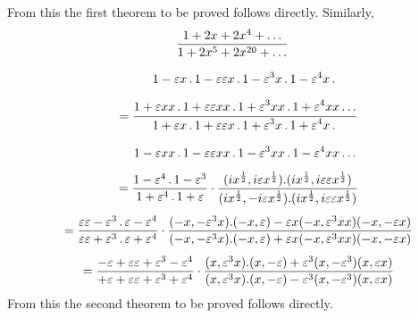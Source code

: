 From this the first theorem to be proved follows directly. Similarly,
\[
\begin{gathered}
\frac{1+2x+2x^4+\mathinner{.\,.\,.}}{1+2x^5+2x^{20}+\mathinner{.\,.\,.}}\\[8pt]
\quad=\dfrac{\begin{gathered}1-\varepsilon x\,.\,1-\varepsilon\varepsilon x\,.\,1-\varepsilon^3x\,.\,1-\varepsilon^4x\,.\,\\[6pt]1+\varepsilon xx\,.\,1+\varepsilon\varepsilon xx\,.\,1+\varepsilon^3xx\,.\,1+\varepsilon^4xx\mathinner{.\,.\,.}\end{gathered}}
 {\begin{gathered}1+\varepsilon x\,.\,1+\varepsilon\varepsilon x\,.\,1+\varepsilon^3x\,.\,1+\varepsilon^4x\,.\,\\[6pt]1-\varepsilon xx\,.\,1-\varepsilon\varepsilon xx\,.\,1-\varepsilon^3xx\,.\,1-\varepsilon^4xx\mathinner{.\,.\,.}\end{gathered}}\\[1ex]
\quad=\frac{1-\varepsilon^4\,.\,1-\varepsilon^3}{1+\varepsilon^4\,.\,1+\varepsilon}
 \cdot\frac{(ix^{\frac12},i\varepsilon x^{\frac12}).(ix^{\frac12},i\varepsilon\varepsilon x^{\frac12})}
 {(ix^{\frac12},-i\varepsilon x^{\frac12}).(ix^{\frac12},i\varepsilon\varepsilon x^{\frac12})}\\[1ex]
\quad=\frac{\varepsilon\varepsilon-\varepsilon^3\,.\,\varepsilon-\varepsilon^4}
 {\varepsilon\varepsilon+\varepsilon^3\,.\,\varepsilon+\varepsilon^4}
 \cdot\frac{(-x,-\varepsilon^3x).(-x,\varepsilon)-\varepsilon x(-x,\varepsilon^3xx)(-x,-\varepsilon x)}
 {(-x,-\varepsilon^3x).(-x,\varepsilon)+\varepsilon x(-x,\varepsilon^3xx)(-x,-\varepsilon x)}\\[1ex]
\quad=\frac{-\varepsilon+\varepsilon\varepsilon+\varepsilon^3-\varepsilon^4}
 {+\varepsilon+\varepsilon\varepsilon+\varepsilon^3+\varepsilon^4}
 \cdot\frac{(x,\varepsilon^3x).(x,-\varepsilon)+\varepsilon^3(x,-\varepsilon^3)(x,\varepsilon x)}
 {(x,\varepsilon^3x).(x,-\varepsilon)-\varepsilon^3(x,-\varepsilon^3)(x,\varepsilon x)}
\end{gathered}
\]
From this the second theorem to be proved follows directly.

\clearpage
\endgroup
